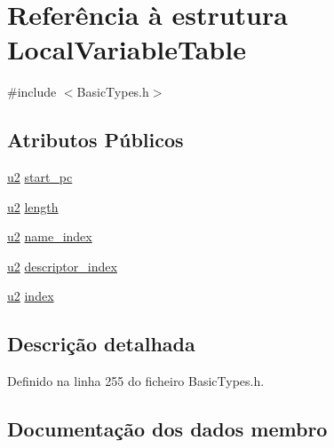 \hypertarget{structLocalVariableTable}{}\section{Referência à estrutura Local\+Variable\+Table}
\label{structLocalVariableTable}


{\ttfamily \#include $<$Basic\+Types.\+h$>$}

\subsection*{Atributos Públicos}
\begin{DoxyCompactItemize}
\item 
\hyperlink{BasicTypes_8h_a732cde1300aafb73b0ea6c2558a7a54f}{u2} \hyperlink{structLocalVariableTable_a59c9262cde04e95d5600bab33ffa969e}{start\+\_\+pc}
\item 
\hyperlink{BasicTypes_8h_a732cde1300aafb73b0ea6c2558a7a54f}{u2} \hyperlink{structLocalVariableTable_a0027db27baa11c80536bc1042490709f}{length}
\item 
\hyperlink{BasicTypes_8h_a732cde1300aafb73b0ea6c2558a7a54f}{u2} \hyperlink{structLocalVariableTable_ac533f255b730a2442710dd5568cdb151}{name\+\_\+index}
\item 
\hyperlink{BasicTypes_8h_a732cde1300aafb73b0ea6c2558a7a54f}{u2} \hyperlink{structLocalVariableTable_a6cab40caf2e138e8a0196b423bfd7e78}{descriptor\+\_\+index}
\item 
\hyperlink{BasicTypes_8h_a732cde1300aafb73b0ea6c2558a7a54f}{u2} \hyperlink{structLocalVariableTable_ab50a3227c68569b6a040306b1f7ebfd1}{index}
\end{DoxyCompactItemize}


\subsection{Descrição detalhada}


Definido na linha 255 do ficheiro Basic\+Types.\+h.



\subsection{Documentação dos dados membro}
\mbox{\label{structLocalVariableTable_a6cab40caf2e138e8a0196b423bfd7e78}} 
